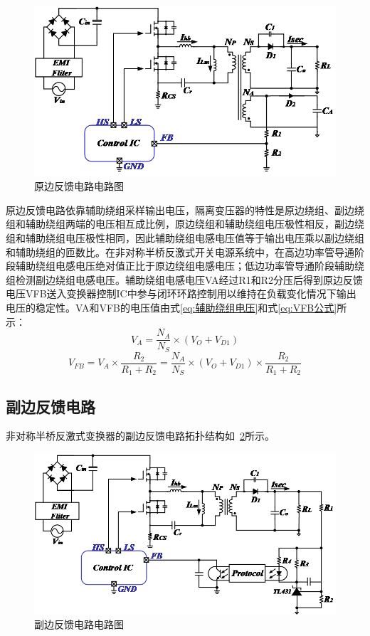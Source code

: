 \begin{figure}[htbp] 
    \centering
    \includegraphics[width=0.8\linewidth]{figures/原边反馈电路图.png}
    \caption{原边反馈电路电路图}
    \label{fig:原边反馈电路电路图}
\end{figure}

原边反馈电路依靠辅助绕组采样输出电压，隔离变压器的特性是原边绕组、副边绕组和辅助绕组两端的电压相互成比例，原边绕组和辅助绕组电压极性相反，副边绕组和辅助绕组电压极性相同，因此辅助绕组电感电压值等于输出电压乘以副边绕组和辅助绕组的匝数比。在非对称半桥反激式开关电源系统中，在高边功率管导通阶段辅助绕组电感电压绝对值正比于原边绕组电感电压；低边功率管导通阶段辅助绕组检测副边绕组电感电压。辅助绕组电感电压VA经过R1和R2分压后得到原边反馈电压VFB送入变换器控制IC中参与闭环环路控制用以维持在负载变化情况下输出电压的稳定性。VA和VFB的电压值由式\eqref{eq:辅助绕组电压}和式\eqref{eq:VFB公式}所示：
\begin{equation}
    \label{eq:辅助绕组电压}
    V_A = \frac{N_A}{N_S}\times(V_O + V_{D1})
\end{equation}
\begin{equation}
    \label{eq:VFB公式}
    V_{FB} = V_A\times\frac{R_2}{R_1+R_2}=\frac{N_A}{N_S}\times(V_O + V_{D1})\times\frac{R_2}{R_1+R_2}
\end{equation}

\subsection{副边反馈电路}
非对称半桥反激式变换器的副边反馈电路拓扑结构如~\ref{fig:副边反馈电路电路图}所示。

\begin{figure}[htbp] 
    \centering
    \includegraphics[width=0.8\linewidth]{figures/副边反馈电路图.png}
    \caption{副边反馈电路电路图}
    \label{fig:副边反馈电路电路图}
\end{figure}

